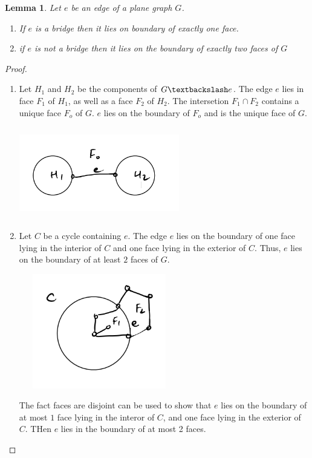 \documentclass[12pt]{article}
\newtheorem*{lemma}{Lemma}
\newenvironment{pro}{\begin{proof}}{\end{proof}}
\begin{document}
\begin{lemma}
	Let $e$ be an edge of a plane graph $G$.
	\begin{enumerate}
		\item If $e$ is a bridge then it lies on boundary of exactly one face.
		\item if $e$ is not a bridge then it lies on the boundary of exactly two faces of $G$
	\end{enumerate}
\end{lemma}


\begin{pro}
	\begin{enumerate}
		\item Let $H_{1}$ and $H_{2}$ be the components of $G\textbackslash e$. The edge $e$ lies in face $F_{1}$ of $H_{1}$, as well as a face $F_{2}$ of $H_{2}$.
		      The intersetion $F_{1}\cap F_{2}$ contains a unique face $F_{o}$ of $G$. $e$ lies on the boundary of $F_{o}$ and is the unique face of $G$.
		      \begin{center}
			      \includegraphics[width=7cm, height=4cm]{proof2}
		      \end{center}

		\item Let $C$ be a cycle containing $e$. The edge $e$ lies on the boundary of one face lying in the interior of $C$ and one face lying in the exterior of $C$.
		      Thus, $e$ lies on the boundary of at least $2$ faces of $G$.

		      \begin{center}
			      \includegraphics[width=7cm, height=5cm]{proof2.1}
		      \end{center}


		      The fact faces are disjoint can be used to show that $e$ lies on the boundary of at most $1$ face lying in the interor of $C$, and one face lying in the exterior of $C$. THen $e$ lies in the boundary of at most 2 faces.

	\end{enumerate}

\end{pro}
\end{document}
